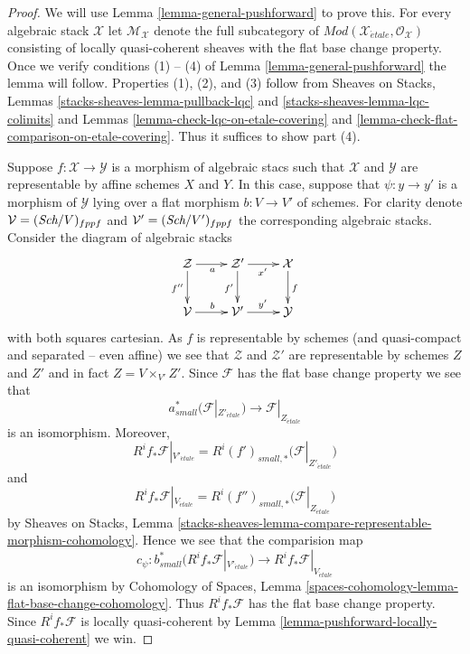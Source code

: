\begin{proof}
We will use
Lemma \ref{lemma-general-pushforward}
to prove this. For every algebraic stack $\mathcal{X}$ let
$\mathcal{M}_\mathcal{X}$ denote the full subcategory of
$\textit{Mod}(\mathcal{X}_{\acute{e}tale}, \mathcal{O}_\mathcal{X})$
consisting of locally quasi-coherent sheaves with the flat base
change property. Once we verify conditions (1) -- (4) of
Lemma \ref{lemma-general-pushforward}
the lemma will follow. Properties (1), (2), and (3) follow from
Sheaves on Stacks, Lemmas \ref{stacks-sheaves-lemma-pullback-lqc} and
\ref{stacks-sheaves-lemma-lqc-colimits}
and
Lemmas \ref{lemma-check-lqc-on-etale-covering} and
\ref{lemma-check-flat-comparison-on-etale-covering}.
Thus it suffices to show part (4).

\medskip\noindent
Suppose $f : \mathcal{X} \to \mathcal{Y}$ is a morphism of algebraic stacs
such that $\mathcal{X}$ and $\mathcal{Y}$ are representable by affine
schemes $X$ and $Y$. In this case, suppose that
$\psi : y \to y'$ is a morphism of $\mathcal{Y}$ lying over
a flat morphism $b : V \to V'$ of schemes. For clarity denote
$\mathcal{V} = (\textit{Sch}/V)_{fppf}$ and $\mathcal{V}' = (\textit{Sch}/V')_{fppf}$
the corresponding algebraic stacks. Consider the diagram
of algebraic stacks
$$
\xymatrix{
\mathcal{Z} \ar[d]_{f''} \ar[r]_a &
\mathcal{Z}' \ar[r]_{x'} \ar[d]_{f'} & \mathcal{X} \ar[d]^f \\
\mathcal{V} \ar[r]^b & \mathcal{V}' \ar[r]^{y'} & \mathcal{Y}
}
$$
with both squares cartesian. As $f$ is representable by schemes
(and quasi-compact and separated -- even affine) we see that $\mathcal{Z}$ and
$\mathcal{Z}'$ are representable by schemes $Z$ and $Z'$ and in
fact $Z = V \times_{V'} Z'$. Since $\mathcal{F}$ has the flat
base change property we see that
$$
a_{small}^*\big(\mathcal{F}|_{Z'_{\acute{e}tale}}\big)
\longrightarrow
\mathcal{F}|_{Z_{\acute{e}tale}}
$$
is an isomorphism. Moreover,
$$
R^if_*\mathcal{F}|_{V'_{\acute{e}tale}} =
R^i(f')_{small, *}\big(\mathcal{F}|_{Z'_{\acute{e}tale}}\big)
$$
and
$$
R^if_*\mathcal{F}|_{V_{\acute{e}tale}} =
R^i(f'')_{small, *}\big(\mathcal{F}|_{Z_{\acute{e}tale}}\big)
$$
by
Sheaves on Stacks, Lemma
\ref{stacks-sheaves-lemma-compare-representable-morphism-cohomology}.
Hence we see that the comparision map
$$
c_\psi :
b_{small}^*(R^if_*\mathcal{F}|_{V'_{\acute{e}tale}})
\longrightarrow
R^if_*\mathcal{F}|_{V_{\acute{e}tale}}
$$
is an isomorphism by
Cohomology of Spaces, Lemma
\ref{spaces-cohomology-lemma-flat-base-change-cohomology}.
Thus $R^if_*\mathcal{F}$ has the flat base change property.
Since $R^if_*\mathcal{F}$ is locally quasi-coherent by
Lemma \ref{lemma-pushforward-locally-quasi-coherent}
we win.
\end{proof}


